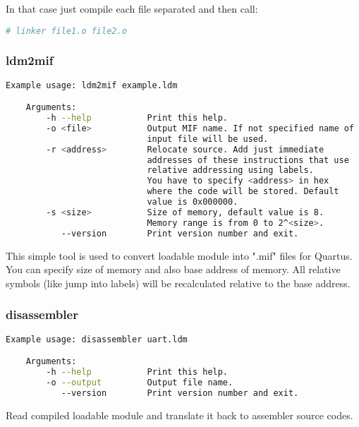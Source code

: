 In that case just compile each file separated and then call:

\begin{lstlisting}[language=bash, frame=single]
    # linker file1.o file2.o
\end{lstlisting}

\subsubsection{ldm2mif}

\begin{lstlisting}[language=bash, frame=single]
    Example usage: ldm2mif example.ldm

    Arguments:
        -h --help           Print this help.
        -o <file>           Output MIF name. If not specified name of
                            input file will be used.
        -r <address>        Relocate source. Add just immediate
                            addresses of these instructions that use
                            relative addressing using labels.
                            You have to specify <address> in hex
                            where the code will be stored. Default
                            value is 0x000000.
        -s <size>           Size of memory, default value is 8.
                            Memory range is from 0 to 2^<size>.
           --version        Print version number and exit.
\end{lstlisting}

This simple tool is used to convert loadable module into ".mif" files for
Quartus. You can specify size of memory and also base address of memory. All
relative symbols (like jump into labels) will be recalculated relative to the
base address.

\subsubsection{disassembler}

\begin{lstlisting}[language=bash, frame=single]
    Example usage: disassembler uart.ldm

    Arguments:
        -h --help           Print this help.
        -o --output         Output file name.
           --version        Print version number and exit.
\end{lstlisting}

Read compiled loadable module and translate it back to assembler source codes.

